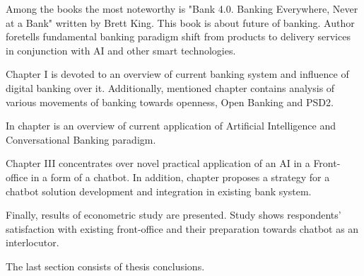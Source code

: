 Among the books the most noteworthy is "Bank 4.0. Banking Everywhere, Never at a Bank" written by Brett King.
This book is about future of banking.
Author foretells fundamental banking paradigm shift from products to delivery services in conjunction with AI and other smart technologies.

Chapter I is devoted to an overview of current banking system and influence of digital banking over it.
Additionally, mentioned chapter  contains analysis of various movements of banking towards openness, Open Banking and PSD2.

In chapter  is an overview of current application of Artificial Intelligence and Conversational Banking paradigm.

Chapter III concentrates over novel practical application of an AI in a Front-office in a form of a chatbot.
In addition, chapter  proposes a strategy for a chatbot solution development and integration in existing bank system.

Finally, results of econometric study are presented. 
Study shows respondents' satisfaction with existing front-office and their preparation towards chatbot as an interlocutor.

The last section consists of thesis conclusions. 
